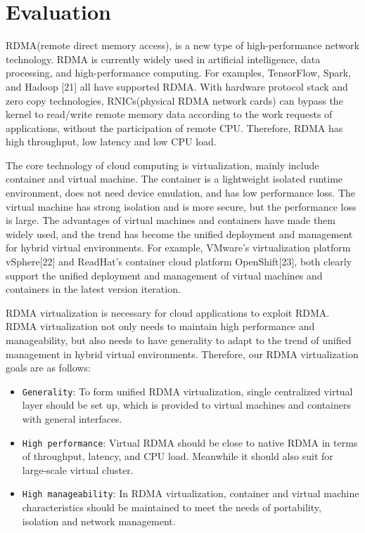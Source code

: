\documentclass[sigplan,screen]{acmart}
\begin{document}
\section{Evaluation}
RDMA(remote direct memory access), is a new type of high-performance network technology. RDMA is currently widely used in artificial intelligence, data processing, and high-performance computing. For examples, TensorFlow, Spark, and Hadoop [21] all have supported RDMA. With hardware protocol stack and zero copy technologies, RNICs(physical RDMA network cards) can bypass the kernel to read/write remote memory data according to the work requests of applications, without the participation of remote CPU. Therefore, RDMA has high throughput, low latency and low CPU load.

The core technology of cloud computing is virtualization, mainly include container and virtual machine. The container is a lightweight isolated runtime environment, does not need device emulation, and has low performance loss. The virtual machine has strong isolation and is more secure, but the performance loss is large. The advantages of virtual machines and containers have made them widely used, and the trend has become the unified deployment and management for hybrid virtual environments. For example, VMware's virtualization platform vSphere[22] and ReadHat's container cloud platform OpenShift[23], both clearly support the unified deployment and management of virtual machines and containers in the latest version iteration.

RDMA virtualization is necessary for cloud applications to exploit RDMA. RDMA virtualization not only needs to maintain high performance and manageability, but also needs to have generality to adapt to the trend of unified management in hybrid virtual environments. Therefore, our RDMA virtualization goals are as follows:

\begin{itemize}
\item {\verb|Generality|}: To form unified RDMA virtualization, single centralized virtual layer should be set up, which is provided to virtual machines and containers with general interfaces.
\item {\verb|High performance|}: Virtual RDMA should be close to native RDMA in terms of throughput, latency, and CPU load. Meanwhile it should also suit for large-scale virtual cluster.
\item {\verb|High manageability|}: In RDMA virtualization, container and virtual machine characteristics should be maintained to meet the needs of portability, isolation and network management.
\end{itemize}
\end{document}
